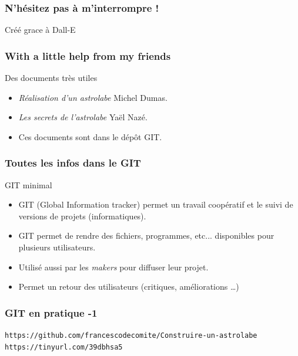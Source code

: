 \documentclass{beamer}
\begin{document}
\begin{frame}\frametitle{N'hésitez pas à  m'interrompre !}
\begin{center}
\end{center}
{\hfill \small Créé grace à Dall-E}
   \end{frame}

   \begin{frame}\frametitle{With a little help from my friends}
\begin{block}{Des documents très utiles}
\begin{itemize}
\item {\em Réalisation d'un astrolabe} Michel Dumas. 
\item {\em Les secrets de l'astrolabe} Ya{\"e}l Nazé.
\item Ces documents sont dans le dépôt GIT. 
\end{itemize}
\end{block}

   \end{frame}
      
   

\begin{frame}\frametitle{Toutes les infos dans le GIT}
\begin{block}{GIT minimal}
\begin{itemize}
\item GIT (Global Information tracker) permet un travail coopératif et le suivi de
versions de projets (informatiques). 
\item GIT permet de rendre des fichiers, programmes, etc... disponibles pour plusieurs utilisateurs.
\item Utilisé aussi par les {\it makers} pour diffuser leur projet. 
\item Permet un retour des utilisateurs (critiques, améliorations \dots)
\end{itemize}
\end{block}
   \end{frame}
   


\begin{frame}\frametitle{GIT en pratique -1}
{\small \tt https://github.com/francescodecomite/Construire-un-astrolabe}
{\tt https://tinyurl.com/39dbhsa5}
\begin{center}
\end{center}
\vfill
\ 

\end{frame}
\end{document}

